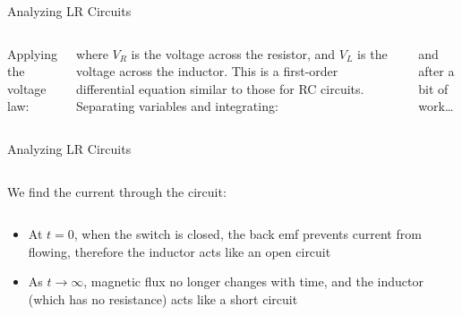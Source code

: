 \documentclass[12pt,aspectratio=169]{beamer}
\begin{document}
\begin{frame}{Analyzing LR Circuits}
  \begin{columns}

    Applying the voltage law:


    \vspace{-.1in}where $V_R$ is the voltage across the resistor, and $V_L$ is
    the voltage across the inductor. This is a first-order differential
    equation similar to those for RC circuits. Separating variables and
    integrating:

    
    and after a bit of work\ldots
  \end{columns}
\end{frame}



\begin{frame}{Analyzing LR Circuits}
  \begin{columns}

    We find the current through the circuit:

  \end{columns}
  \vspace{.2in}
  \begin{itemize}
  \item At $t=0$, when the switch is closed, the back emf prevents current from
    flowing, therefore the inductor acts like an open circuit
  \item As $t\to\infty$, magnetic flux no longer changes with time, and
    the inductor (which has no resistance) acts like a short circuit
  \end{itemize}
\end{frame}
\end{document}
